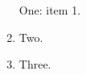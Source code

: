 \documentclass{article}
\begin{document}
\begin{enumerate}
\item [One:] item 1.
\item Two.
\item Three.
\end{enumerate}
\end{document}
